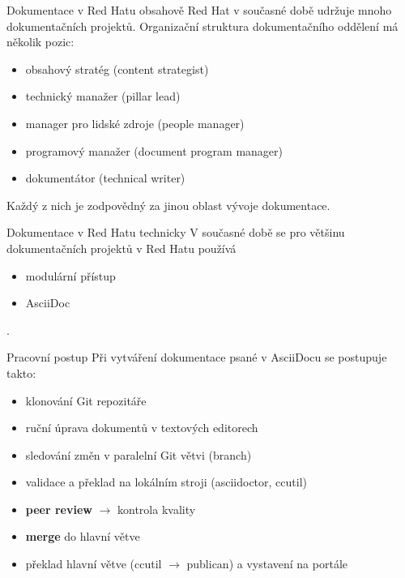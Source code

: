 \documentclass[12pt]{beamer}
\begin{document}
\begin{frame}{Dokumentace v Red Hatu obsahově}
Red Hat v současné době udržuje mnoho dokumentačních projektů. Organizační struktura dokumentačního oddělení má několik pozic:

\begin{itemize}
	\item obsahový stratég (content strategist)
	\item technický manažer (pillar lead)
	\item manager pro lidské zdroje (people manager)
	\item programový manažer (document program manager)
	\item dokumentátor (technical writer)
\end{itemize}

Každý z nich je zodpovědný za jinou oblast vývoje dokumentace.
\end{frame}


	\begin{frame}{Dokumentace v Red Hatu technicky}
		V současné době se pro většinu dokumentačních projektů v Red Hatu používá 
		\begin{itemize}
			\item modulární přístup
			\item AsciiDoc
		\end{itemize}.
		
	\end{frame}

	\begin{frame}{Pracovní postup}
	Při vytváření dokumentace psané v AsciiDocu se postupuje takto:

	\begin{itemize}
		\item klonování Git repozitáře
		\item ruční úprava dokumentů v textových editorech
		\item sledování změn v paralelní Git větvi (branch)
		\item validace a překlad na lokálním stroji (asciidoctor, ccutil)
		\item \textbf{peer review} $\longrightarrow$ kontrola kvality
		\item \textbf{merge} do hlavní větve
		\item překlad hlavní větve (ccutil $\longrightarrow$ publican) a vystavení na portále
	\end{itemize}
	\end{frame}
\end{document}
